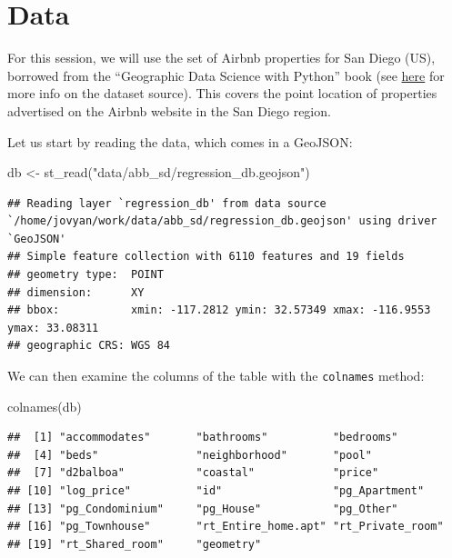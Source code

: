 \documentclass[
]{book}
\newenvironment{Shaded}{\begin{snugshade}}{\end{snugshade}}
\newcommand{\FunctionTok}[1]{\textcolor[rgb]{0.00,0.00,0.00}{#1}}
\newcommand{\NormalTok}[1]{#1}
\newcommand{\OtherTok}[1]{\textcolor[rgb]{0.56,0.35,0.01}{#1}}
\newcommand{\StringTok}[1]{\textcolor[rgb]{0.31,0.60,0.02}{#1}}
\begin{document}
\hypertarget{data}{%
\section{Data}\label{data}}

For this session, we will use the set of Airbnb properties for San Diego (US), borrowed from the ``Geographic Data Science with Python'' book (see \href{https://geographicdata.science/book/data/airbnb/regression_cleaning.html}{here} for more info on the dataset source). This covers the point location of properties advertised on the Airbnb website in the San Diego region.

Let us start by reading the data, which comes in a GeoJSON:

\begin{Shaded}
\begin{Highlighting}[]
\NormalTok{db }\OtherTok{\textless{}{-}} \FunctionTok{st\_read}\NormalTok{(}\StringTok{"data/abb\_sd/regression\_db.geojson"}\NormalTok{)}
\end{Highlighting}
\end{Shaded}

\begin{verbatim}
## Reading layer `regression_db' from data source `/home/jovyan/work/data/abb_sd/regression_db.geojson' using driver `GeoJSON'
## Simple feature collection with 6110 features and 19 fields
## geometry type:  POINT
## dimension:      XY
## bbox:           xmin: -117.2812 ymin: 32.57349 xmax: -116.9553 ymax: 33.08311
## geographic CRS: WGS 84
\end{verbatim}

We can then examine the columns of the table with the \texttt{colnames} method:

\begin{Shaded}
\begin{Highlighting}[]
\FunctionTok{colnames}\NormalTok{(db)}
\end{Highlighting}
\end{Shaded}

\begin{verbatim}
##  [1] "accommodates"       "bathrooms"          "bedrooms"          
##  [4] "beds"               "neighborhood"       "pool"              
##  [7] "d2balboa"           "coastal"            "price"             
## [10] "log_price"          "id"                 "pg_Apartment"      
## [13] "pg_Condominium"     "pg_House"           "pg_Other"          
## [16] "pg_Townhouse"       "rt_Entire_home.apt" "rt_Private_room"   
## [19] "rt_Shared_room"     "geometry"
\end{verbatim}
\end{document}
